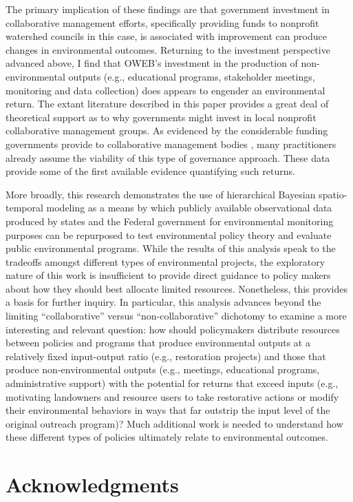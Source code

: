 \documentclass[12pt,a4paper,titlepage]{article}
\begin{document}
The primary implication of these findings are that government investment in collaborative management efforts, specifically providing funds to nonprofit watershed councils in this case, is associated with improvement can produce changes in environmental outcomes. Returning to the investment perspective advanced above, I find that OWEB’s investment in the production of non-environmental outputs (e.g., educational programs, stakeholder meetings, monitoring and data collection) does appears to engender an environmental return. The extant literature described in this paper provides a great deal of theoretical support as to why governments might invest in local nonprofit collaborative management groups. As evidenced by the considerable funding governments provide to collaborative management bodies \parencite[e.g.,][]{sabatier2005}, many practitioners already assume the viability of this type of governance approach. These data provide some of the first available evidence quantifying such returns.

More broadly, this research demonstrates the use of hierarchical Bayesian spatio-temporal modeling as a means by which publicly available observational data produced by states and the Federal government for environmental monitoring purposes can be repurposed to test environmental policy theory and evaluate public environmental programs. While the results of this analysis speak to the tradeoffs amongst different types of environmental projects, the exploratory nature of this work is insufficient to provide direct guidance to policy makers about how they should best allocate limited resources. Nonetheless, this provides a basis for further inquiry. In particular, this analysis advances beyond the limiting ``collaborative'' versus ``non-collaborative'' dichotomy to examine a more interesting and relevant question: how should policymakers distribute resources between policies and programs that produce environmental outputs at a relatively fixed input-output ratio (e.g., restoration projects) and those that produce non-environmental outputs (e.g., meetings, educational programs, administrative support) with the potential for returns that exceed inputs (e.g., motivating landowners and resource users to take restorative actions or modify their environmental behaviors in ways that far outstrip the input level of the original outreach program)? Much additional work is needed to understand how these different types of policies ultimately relate to environmental outcomes.

\section*{Acknowledgments}
\end{document}
